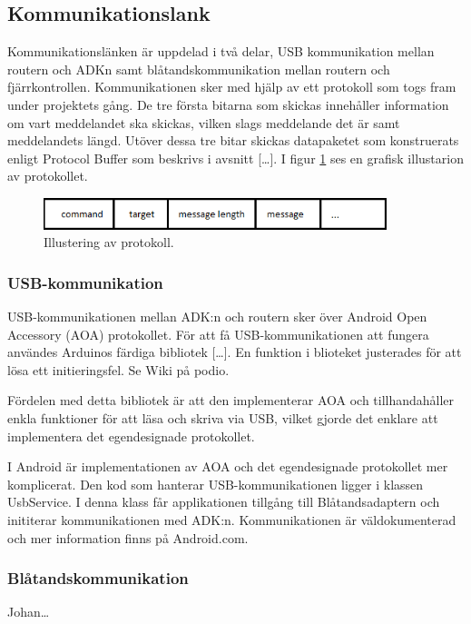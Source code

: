 \subsection{Kommunikationslank}
Kommunikationslänken är uppdelad i två delar, USB kommunikation mellan routern och ADKn 
samt blåtandskommunikation mellan routern och fjärrkontrollen. Kommunikationen sker med hjälp av ett protokoll som 
togs fram under projektets gång. De tre första bitarna som skickas innehåller information om vart meddelandet ska skickas, 
vilken slags meddelande det är samt meddelandets längd. Utöver dessa tre bitar skickas datapaketet som konstruerats enligt 
Protocol Buffer som beskrivs i avsnitt [\ldots]. I figur \ref{fig:protocol} ses en grafisk illustarion av protokollet.


\begin{figure}[htbp!]
\centering
\includegraphics[width=10cm]{../../includes/figures/protocol.png}
\caption{Illustering av protokoll.}
\label{fig:protocol}
\end{figure}


\subsubsection{USB-kommunikation}
USB-kommunikationen mellan ADK:n och routern sker över Android Open Accessory (AOA) protokollet. 
För att få USB-kommunikationen att fungera användes Arduinos färdiga bibliotek [\ldots]. En funktion i blioteket justerades för 
att lösa ett initieringsfel. Se Wiki på podio.
 
Fördelen med detta bibliotek är att den implementerar AOA och tillhandahåller enkla funktioner för att läsa och skriva via USB, vilket 
gjorde det enklare att implementera det egendesignade protokollet.

I Android är implementationen av AOA och det egendesignade protokollet mer komplicerat. Den kod som hanterar USB-kommunikationen ligger 
i klassen UsbService. I denna klass får applikationen tillgång till Blåtandsadaptern och inititerar kommunikationen med ADK:n. 
Kommunikationen är väldokumenterad och mer information finns på Android.com.
 
\subsubsection{Blåtandskommunikation}
Johan\ldots
